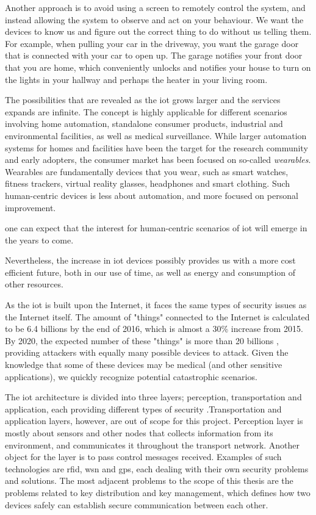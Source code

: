 Another approach is to avoid using a screen to remotely control the system, and instead allowing the system to observe and act on your behaviour. We want the devices to know us and figure out the correct thing to do without us telling them. For example, when pulling your car in the driveway, you want the garage door that is connected with your car to open up. The garage notifies your front door that you are home, which conveniently unlocks and notifies your house to turn on the lights in your hallway and perhaps the heater in your living room.




The possibilities that are revealed as the \gls{iot} grows larger and the services expands are infinite. The concept is highly applicable for different scenarios involving home automation, standalone consumer products, industrial and environmental facilities, as well as medical surveillance. While larger automation systems for homes and facilities have been the target for the research community and early adopters, the consumer market has been focused on so-called \emph{wearables}. Wearables are fundamentally devices that you wear, such as smart watches, fitness trackers, virtual reality glasses, headphones and smart clothing. Such human-centric devices is less about automation, and more focused on personal improvement.

one can expect that the interest for human-centric scenarios of \gls{iot} will emerge in the years to come.

Nevertheless, the increase in \gls{iot} devices possibly provides us with a more cost efficient future, both in our use of time, as well as energy and consumption of other resources.


As the \gls{iot} is built upon the Internet, it faces the same types of security issues as the Internet itself. The amount of "things" connected to the Internet is calculated to be 6.4 billions by the end of 2016, which is almost a 30\% increase from 2015. By 2020, the expected number of these "things" is more than 20 billions \cite{iot-gartner}, providing attackers with equally many possible devices to attack. Given the knowledge that some of these devices may be medical (and other sensitive applications), we quickly recognize potential catastrophic scenarios.


The \gls{iot} architecture is divided into three layers; perception, transportation and application, each providing different types of security \cite{Jing2014}.Transportation and application layers, however, are out of scope for this project. Perception layer is mostly about sensors and other nodes that collects information from its environment, and communicates it throughout the transport network. Another object for the layer is to pass control messages received. Examples of such technologies are \gls{rfid}, \gls{wsn} and \gls{gps}, each dealing with their own security problems and solutions. The most adjacent problems to the scope of this thesis are the problems related to key distribution and key management, which defines how two devices safely can establish secure communication between each other.

